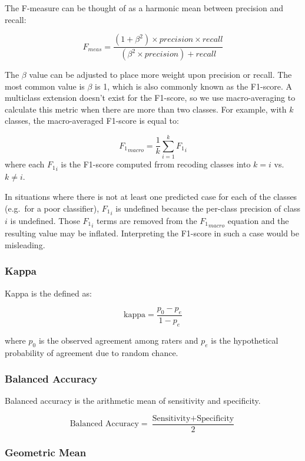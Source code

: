 \documentclass[
]{report}
\begin{document}
The F-measure can be thought of as a harmonic mean between precision and recall:

\[
F_{meas} = \frac{(1 + \beta^2) \times precision \times recall}{(\beta^2 \times precision) + recall}
\label{eq:f1}
\]

The \(\beta\) value can be adjusted to place more weight upon precision or recall. The most common value is \(\beta\) is 1, which is also commonly known as the F1-score. A multiclass extension doesn't exist for the F1-score, so we use macro-averaging to calculate this metric when there are more than two classes. For example, with \(k\) classes, the macro-averaged F1-score is equal to:

\[
{F_1}_{macro} = \frac{1}{k} \sum_{i=1}^{k}{F_1}_{i}
\label{eq:f1-macro}
\] where each \({F_1}_{i}\) is the F1-score computed frrom recoding classes into \(k=i\) vs.~\(k \neq i\).

In situations where there is not at least one predicted case for each of the classes (e.g.~for a poor classifier), \({F_1}_{i}\) is undefined because the per-class precision of class \(i\) is undefined. Those \({F_1}_{i}\) terms are removed from the \({F_1}_{macro}\) equation and the resulting value may be inflated. Interpreting the F1-score in such a case would be misleading.

\subsubsection{Kappa}\label{kappa}

Kappa is the defined as:

\[
\text{kappa} = \frac{p_0 - p_e}{1 - p_e}
\label{eq:kappa}
\]

where \(p_0\) is the observed agreement among raters and \(p_e\) is the hypothetical probability of agreement due to random chance.

\subsubsection{Balanced Accuracy}\label{balanced-accuracy}

Balanced accuracy is the arithmetic mean of sensitivity and specificity.

\[
\text{Balanced Accuracy} = \frac{\text{Sensitivity} + \text{Specificity}}{2}
\label{eq:bal-accuracy}
\]

\subsubsection{Geometric Mean}\label{geometric-mean}
\end{document}
